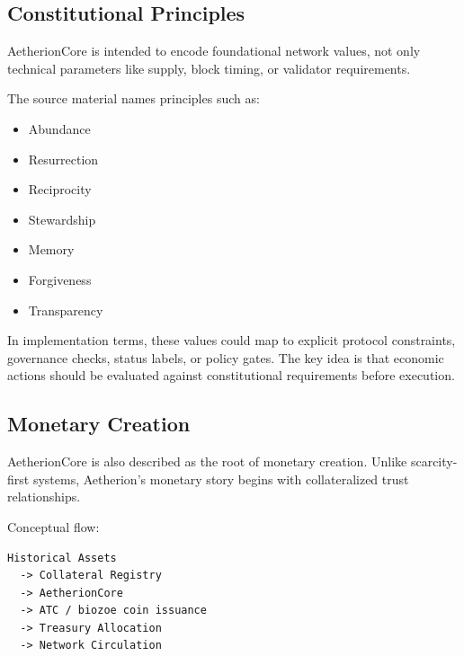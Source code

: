 ﻿\documentclass[12pt]{article}
\begin{document}
\subsection{Constitutional Principles}


AetherionCore is intended to encode foundational network values, not only technical parameters like supply, block timing, or validator requirements.

The source material names principles such as:

\begin{itemize}
  \item Abundance
\end{itemize}
\begin{itemize}
  \item Resurrection
\end{itemize}
\begin{itemize}
  \item Reciprocity
\end{itemize}
\begin{itemize}
  \item Stewardship
\end{itemize}
\begin{itemize}
  \item Memory
\end{itemize}
\begin{itemize}
  \item Forgiveness
\end{itemize}
\begin{itemize}
  \item Transparency
\end{itemize}

In implementation terms, these values could map to explicit protocol constraints, governance checks, status labels, or policy gates. The key idea is that economic actions should be evaluated against constitutional requirements before execution.

\subsection{Monetary Creation}


AetherionCore is also described as the root of monetary creation. Unlike scarcity-first systems, Aetherion's monetary story begins with collateralized trust relationships.

Conceptual flow:

\begin{verbatim}
Historical Assets
  -> Collateral Registry
  -> AetherionCore
  -> ATC / biozoe coin issuance
  -> Treasury Allocation
  -> Network Circulation
\end{verbatim}
\end{document}
